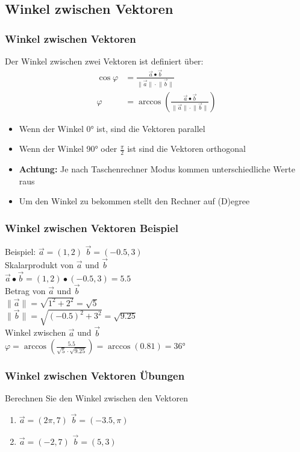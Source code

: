 \subsection{Winkel zwischen Vektoren}
\begin{frame}
    \frametitle{Winkel zwischen Vektoren}
    Der Winkel zwischen zwei Vektoren ist definiert über:
	\begin{align*}
		    \cos \varphi &= \frac{\vec{a} \bullet \vec{b}}{\lVert \vec{a} \rVert \cdot \lVert \vec{b} \rVert} \\
		    \varphi &= \arccos \left( \frac{\vec{a} \bullet \vec{b}}{\lVert \vec{a} \rVert \cdot \lVert \vec{b} \rVert} \right)
	\end{align*}
	\begin{itemize}
		\item Wenn der Winkel 0° ist, sind die Vektoren parallel
		\item Wenn der Winkel 90° oder $\frac{\pi}{2}$ ist sind die Vektoren orthogonal
		\item \textbf{Achtung:} Je nach Taschenrechner Modus kommen unterschiedliche Werte raus
		\item Um den Winkel zu bekommen stellt den Rechner auf (D)egree
	\end{itemize}
\end{frame}

\begin{frame}
	\frametitle{Winkel zwischen Vektoren Beispiel}
	Beispiel: $\vec{a} = (1,2)$ $\vec{b} = (-0.5, 3)$ \\
	$ $ \\
	Skalarprodukt von $\vec{a}$ und $\vec{b}$ \\
	$\vec{a} \bullet \vec{b} = (1,2) \bullet (-0.5, 3) = 5.5$ \\
	$ $ \\
	Betrag von $\vec{a}$ und $\vec{b}$ \\
	$\lVert \vec{a} \rVert = \sqrt{1^2 + 2^2} = \sqrt{5}$ \\
	$\lVert \vec{b} \rVert = \sqrt{(-0.5)^2 + 3^2} = \sqrt{9.25}$ \\
	$ $ \\
	Winkel zwischen $\vec{a}$ und $\vec{b}$ \\ 
	$\varphi = \arccos(\frac{5.5}{\sqrt{5} \cdot \sqrt{9.25}}) = \arccos(0.81) = 36$°
\end{frame}

\begin{frame}
	\frametitle{Winkel zwischen Vektoren Übungen}
	Berechnen Sie den Winkel zwischen den Vektoren
	\begin{enumerate}
		\item $\vec{a} = (2\pi, 7)$ $\vec{b} = (-3.5, \pi)$
		\item $\vec{a} = (-2, 7)$ $\vec{b} = (5, 3)$
	\end{enumerate}
\end{frame}

